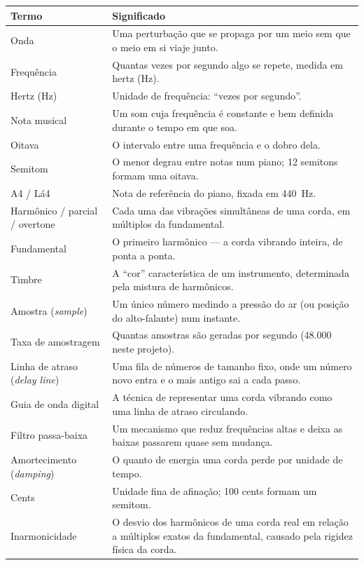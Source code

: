 \documentclass[11pt,oneside]{book}
\begin{document}
\begin{center}
\small
\begin{tabularx}{\linewidth}{p{4.4cm}X}
\toprule
\textbf{Termo} & \textbf{Significado} \\
\midrule
Onda & Uma perturbação que se propaga por um meio sem que o meio em si viaje junto. \\
Frequência & Quantas vezes por segundo algo se repete, medida em hertz (Hz). \\
Hertz (Hz) & Unidade de frequência: \enquote{vezes por segundo}. \\
Nota musical & Um som cuja frequência é constante e bem definida durante o tempo em que soa. \\
Oitava & O intervalo entre uma frequência e o dobro dela. \\
Semitom & O menor degrau entre notas num piano; 12 semitons formam uma oitava. \\
A4 / Lá4 & Nota de referência do piano, fixada em 440~Hz. \\
Harmônico / parcial / overtone & Cada uma das vibrações simultâneas de uma corda, em múltiplos da fundamental. \\
Fundamental & O primeiro harmônico --- a corda vibrando inteira, de ponta a ponta. \\
Timbre & A \enquote{cor} característica de um instrumento, determinada pela mistura de harmônicos. \\
Amostra (\emph{sample}) & Um único número medindo a pressão do ar (ou posição do alto-falante) num instante. \\
Taxa de amostragem & Quantas amostras são geradas por segundo (48.000 neste projeto). \\
Linha de atraso (\emph{delay line}) & Uma fila de números de tamanho fixo, onde um número novo entra e o mais antigo sai a cada passo. \\
Guia de onda digital & A técnica de representar uma corda vibrando como uma linha de atraso circulando. \\
Filtro passa-baixa & Um mecanismo que reduz frequências altas e deixa as baixas passarem quase sem mudança. \\
Amortecimento (\emph{damping}) & O quanto de energia uma corda perde por unidade de tempo. \\
Cents & Unidade fina de afinação; 100 cents formam um semitom. \\
Inarmonicidade & O desvio dos harmônicos de uma corda real em relação a múltiplos exatos da fundamental, causado pela rigidez física da corda. \\

\end{tabularx}
\end{center}
\end{document}
